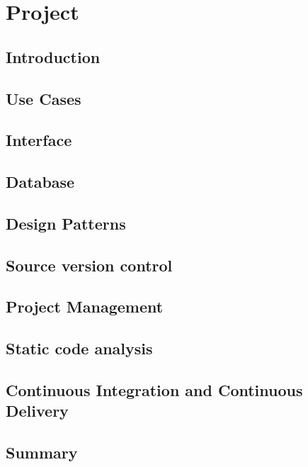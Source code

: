 \chapter{Project}
\section{Introduction}

\section{Use Cases}

\section{Interface}

\section{Database}

\section{Design Patterns}

\section{Source version control}

\section{Project Management}

\section{Static code analysis}

\section{Continuous Integration and Continuous Delivery}

\section{Summary}
